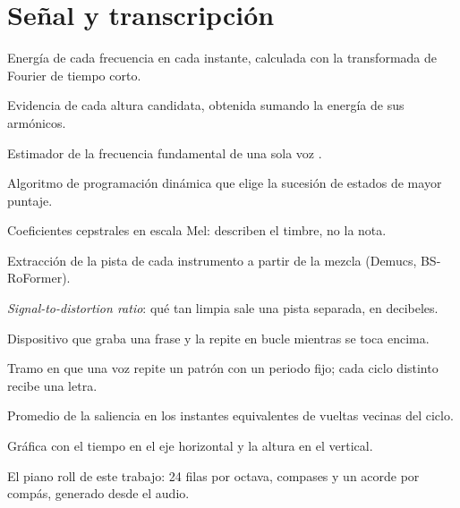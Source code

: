 \section*{Señal y transcripción}
\begin{description}[style=nextline,leftmargin=1.2em]
  \item[Espectrograma] Energía de cada frecuencia en cada instante, calculada con la transformada de Fourier de tiempo
  corto.
  \item[Saliencia armónica] Evidencia de cada altura candidata, obtenida sumando la energía de sus armónicos.
  \item[pYIN] Estimador de la frecuencia fundamental de una sola voz \citep{mauch2014}.
  \item[Viterbi] Algoritmo de programación dinámica que elige la sucesión de estados de mayor puntaje.
  \item[MFCC] Coeficientes cepstrales en escala Mel: describen el timbre, no la nota.
  \item[Separación de fuentes] Extracción de la pista de cada instrumento a partir de la mezcla (Demucs, BS-RoFormer).
  \item[SDR] \emph{Signal-to-distortion ratio}: qué tan limpia sale una pista separada, en decibeles.
  \item[Looper] Dispositivo que graba una frase y la repite en bucle mientras se toca encima.
  \item[Ciclo] Tramo en que una voz repite un patrón con un periodo fijo; cada ciclo distinto recibe una letra.
  \item[Consenso entre vueltas] Promedio de la saliencia en los instantes equivalentes de vueltas vecinas del ciclo.
  \item[Piano roll] Gráfica con el tiempo en el eje horizontal y la altura en el vertical.
  \item[Tabroll] El piano roll de este trabajo: 24 filas por octava, compases y un acorde por compás, generado desde el
  audio.
\end{description}


